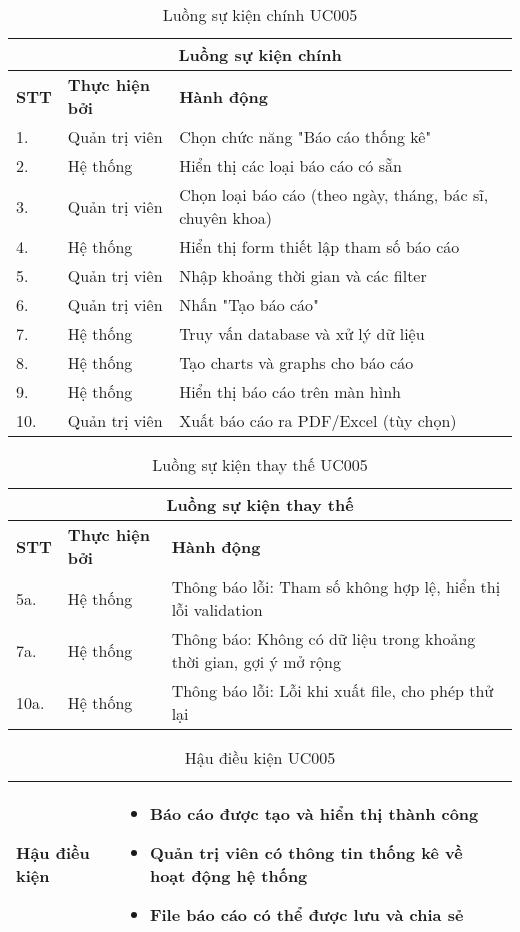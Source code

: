 \documentclass[../DoAn.tex]{subfiles}
\begin{document}
\begin{table}[H]
\centering
\begin{tabular}{|p{1cm}|p{3cm}|p{9cm}|}
\hline
\multicolumn{3}{|c|}{\textbf{Luồng sự kiện chính}} \\
\hline
\textbf{STT} & \textbf{Thực hiện bởi} & \textbf{Hành động} \\
\hline
1. & Quản trị viên & Chọn chức năng "Báo cáo thống kê" \\
\hline
2. & Hệ thống & Hiển thị các loại báo cáo có sẵn \\
\hline
3. & Quản trị viên & Chọn loại báo cáo (theo ngày, tháng, bác sĩ, chuyên khoa) \\
\hline
4. & Hệ thống & Hiển thị form thiết lập tham số báo cáo \\
\hline
5. & Quản trị viên & Nhập khoảng thời gian và các filter \\
\hline
6. & Quản trị viên & Nhấn "Tạo báo cáo" \\
\hline
7. & Hệ thống & Truy vấn database và xử lý dữ liệu \\
\hline
8. & Hệ thống & Tạo charts và graphs cho báo cáo \\
\hline
9. & Hệ thống & Hiển thị báo cáo trên màn hình \\
\hline
10. & Quản trị viên & Xuất báo cáo ra PDF/Excel (tùy chọn) \\
\hline
\end{tabular}
\caption{Luồng sự kiện chính UC005}
\end{table}

\begin{table}[H]
\centering
\begin{tabular}{|p{1cm}|p{3cm}|p{9cm}|}
\hline
\multicolumn{3}{|c|}{\textbf{Luồng sự kiện thay thế}} \\
\hline
\textbf{STT} & \textbf{Thực hiện bởi} & \textbf{Hành động} \\
\hline
5a. & Hệ thống & Thông báo lỗi: Tham số không hợp lệ, hiển thị lỗi validation \\
\hline
7a. & Hệ thống & Thông báo: Không có dữ liệu trong khoảng thời gian, gợi ý mở rộng \\
\hline
10a. & Hệ thống & Thông báo lỗi: Lỗi khi xuất file, cho phép thử lại \\
\hline
\end{tabular}
\caption{Luồng sự kiện thay thế UC005}
\end{table}

\begin{table}[H]
\centering
\begin{tabular}{|p{3cm}|p{10cm}|}
\hline
\textbf{Hậu điều kiện} & 
\begin{itemize}
    \item Báo cáo được tạo và hiển thị thành công
    \item Quản trị viên có thông tin thống kê về hoạt động hệ thống
    \item File báo cáo có thể được lưu và chia sẻ
\end{itemize} \\
\hline
\end{tabular}
\caption{Hậu điều kiện UC005}
\end{table}
\end{document}
